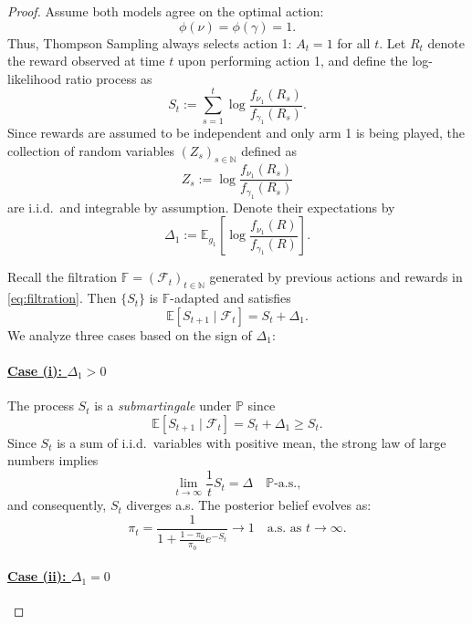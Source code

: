 \documentclass[10pt,a4paper]{amsart}
\begin{document}
\begin{proof}
Assume both models agree on the optimal action:
\[
\phi(\nu) = \phi(\gamma) = 1.
\]
Thus, Thompson Sampling always selects action 1: \( A_t = 1 \) for all \( t \). 
Let \( R_t \) denote the reward observed at time \( t \) upon performing action 1, and define the log-likelihood ratio process as
\[
S_t := \sum_{s=1}^t \log \frac{f_{\nu_1}(R_s)}{f_{\gamma_1}(R_s)}.
\]
Since rewards are assumed to be independent and only arm 1 is being played, the collection of random variables $(Z_s)_{s \in \mathbb N}$ defined as
\[
Z_s := \log \frac{f_{\nu_1}(R_s)}{f_{\gamma_1}(R_s)}
\]
are i.i.d.~and integrable by assumption.
Denote their expectations by
\[
\Delta_1 := \mathbb{E}_{g_1} \left[ \log \frac{f_{\nu_1}(R)}{f_{\gamma_1}(R)} \right].
\]

Recall the filtration $\mathbb F = (\mathcal F_t)_{t \in \mathbb N}$ generated by previous actions and rewards in \eqref{eq:filtration}.
Then \( \{S_t\} \) is $\mathbb F$-adapted and satisfies
\[
\mathbb{E}[S_{t+1} \mid \mathcal{F}_t] = S_t + \Delta_1.
\]
We analyze three cases based on the sign of \( \Delta_1 \):

\paragraph{\underline{Case (i): $\Delta_1 > 0$}}

The process \( S_t \) is a \emph{submartingale} under \( \mathbb{P} \) since
\[
\mathbb{E}[S_{t+1} \mid \mathcal{F}_t] = S_t + \Delta_1 \geq S_t.
\]
Since \( S_t \) is a sum of i.i.d.~variables with positive mean, the strong law of large numbers implies
\[
\lim_{t \to \infty} \frac 1 t S_t = \Delta \quad \text{$\mathbb P$-a.s.},
\]
and consequently, $S_t$ diverges a.s.
The posterior belief evolves as:
\[
\pi_t = \frac{1}{1 + \frac{1 - \pi_0}{\pi_0} e^{-S_t}} \to 1 \quad \text{a.s. as $t \to \infty$.}
\]

\paragraph{\underline{Case (ii): $\Delta_1 = 0$}}


\end{proof}
\end{document}
